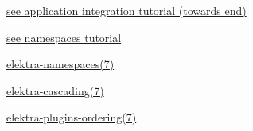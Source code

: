\begin{DoxyItemize}
\item \hyperlink{doc_tutorials_application-integration_md}{see application integration tutorial (towards end)}
\item \hyperlink{doc_tutorials_namespaces_md}{see namespaces tutorial}
\item \hyperlink{md_doc_help_elektra-namespaces_doc_help_elektra-namespaces_md}{elektra-\/namespaces(7)}
\item \hyperlink{md_doc_help_elektra-cascading_doc_help_elektra-cascading_md}{elektra-\/cascading(7)}
\item \hyperlink{md_doc_help_elektra-plugins-ordering_doc_help_elektra-plugins-ordering_md}{elektra-\/plugins-\/ordering(7)} 
\end{DoxyItemize}